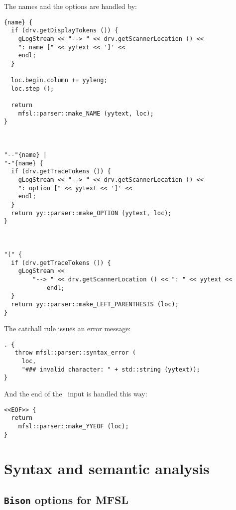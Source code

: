 The names and the options are handled by:
\begin{lstlisting}[language=Flex]
{name} {
  if (drv.getDisplayTokens ()) {
    gLogStream << "--> " << drv.getScannerLocation () <<
    ": name [" << yytext << ']' <<
    endl;
  }

  loc.begin.column += yyleng;
  loc.step ();

  return
    mfsl::parser::make_NAME (yytext, loc);
}



"--"{name} |
"-"{name} {
  if (drv.getTraceTokens ()) {
    gLogStream << "--> " << drv.getScannerLocation () <<
    ": option [" << yytext << ']' <<
    endl;
  }
  return yy::parser::make_OPTION (yytext, loc);
}



"(" {
  if (drv.getTraceTokens ()) {
    gLogStream <<
    	"--> " << drv.getScannerLocation () << ": " << yytext <<
			endl;
  }
  return yy::parser::make_LEFT_PARENTHESIS (loc);
}
\end{lstlisting}

The catchall rule issues an error message:
\begin{lstlisting}[language=Flex]
. {
   throw mfsl::parser::syntax_error (
     loc,
     "### invalid character: " + std::string (yytext));
}
\end{lstlisting}

And the end of the \mfslLang\ input is handled this way:
\begin{lstlisting}[language=Flex]
<<EOF>> {
  return
    mfsl::parser::make_YYEOF (loc);
}
\end{lstlisting}


\section{Syntax and semantic analysis}


\subsection{{\tt Bison} options for MFSL}

